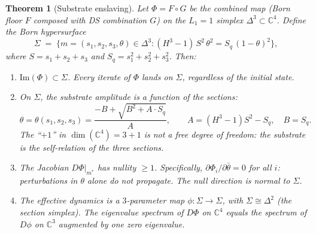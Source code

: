 \documentclass[11pt,a4paper]{article}
\newtheorem{theorem}{Theorem}[section]
\theoremstyle{definition}
\theoremstyle{remark}
\newcommand{\C}{\mathbb{C}}
\begin{document}
\begin{theorem}[Substrate enslaving]\label{thm:enslaving}
Let $\Phi=F\circ G$ be the combined map (Born floor $F$ composed with DS combination $G$) on the $L_1=1$ simplex $\Delta^3\subset\C^4$. Define the \emph{Born hypersurface}
\begin{equation}\label{eq:born_surface}
\Sigma\;=\;\bigl\{m=(s_1,s_2,s_3,\theta)\in\Delta^3 : (H^3-1)\,S^2\,\theta^2 = S_q\,(1-\theta)^2\bigr\},
\end{equation}
where $S=s_1+s_2+s_3$ and $S_q=s_1^2+s_2^2+s_3^2$. Then:
\begin{enumerate}[nosep]
\item\label{it:image} $\mathrm{Im}(\Phi)\subset\Sigma$. Every iterate of $\Phi$ lands on $\Sigma$, regardless of the initial state.
\item\label{it:function} On $\Sigma$, the substrate amplitude is a function of the sections:
\begin{equation}\label{eq:theta_enslaved}
\theta = \theta(s_1,s_2,s_3) = \frac{-B+\sqrt{B^2+A\cdot S_q}}{A},\qquad A=(H^3\!-\!1)S^2-S_q,\quad B=S_q.
\end{equation}
The ``$+1$'' in $\dim(\C^4)=3+1$ is not a free degree of freedom: the substrate is the self-relation of the three sections.
\item\label{it:nullity} The Jacobian $D\Phi|_{m^*}$ has nullity $\geq 1$. Specifically, $\partial\Phi_i/\partial\bar{\theta}=0$ for all $i$: perturbations in $\theta$ alone do not propagate. The null direction is normal to $\Sigma$.
\item\label{it:effective} The effective dynamics is a $3$-parameter map $\phi:\Sigma\to\Sigma$, with $\Sigma\cong\Delta^2$ (the section simplex). The eigenvalue spectrum of $D\Phi$ on $\C^4$ equals the spectrum of $D\phi$ on $\C^3$ augmented by one zero eigenvalue.
\end{enumerate}
\end{theorem}
\end{document}
